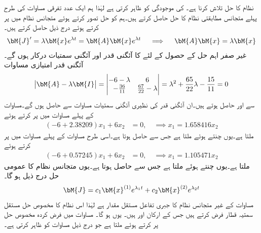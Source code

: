  نظام کا حل تلاش کرنا ہے۔ کی موجودگی   کو ظاہر کرتی ہے لہٰذا ہم ایک عدد تفرقی مساوات کی طرح پہلے متجانس مطابقتی نظام  کا حل حاصل کرتے ہیں۔ہم  کو حل تصور کرتے ہوئے متجانس نظام میں پر کرتے ہوئے درج ذیل حاصل کرتے ہیں۔
\begin{align*}
\bM{J}'=\lambda \bM{x}e^{\lambda t}=\bM{A}\bM{x}e^{\lambda t} \quad \implies \quad \bM{A}\bM{x}=\lambda \bM{x}
\end{align*}
غیر صفر اہم حل کے حصول کے لئے  کا آئگنی قدر اور آئگنی سمتیات درکار ہوں گے۔آئگنی قدر امتیازی مساوات
\begin{align*}
\abs{\bM{A}-\lambda \bM{I}}=\begin{vmatrix} -6-\lambda& 6 \\-\frac{36}{11}&\frac{67}{22}-\lambda \end{vmatrix}=\lambda^2+\frac{65}{22}\lambda-\frac{15}{11}=0
\end{align*}
سے  اور  حاصل ہوتے ہیں۔ان آئگنی قدر کی نظیری آئگنی سمتیات مساوات  سے حاصل ہوں گے۔مساوات  کے پہلے مساوات میں   پر کرتے ہوئے 
\begin{align*}
(-6+2.38209)x_1+6x_2&=0,\quad \implies x_1=1.658416x_2
\end{align*}
ملتا ہے۔یوں  چنتے ہوئے  ملتا ہے جس سے  حاصل ہوتا ہے۔اسی طرح مساوات  کے پہلے مساوات میں   پر کرتے ہوئے 
\begin{align*}
(-6+0.57245)x_1+6x_2&=0,\quad \implies x_1=1.105471x_2
\end{align*}
ملتا ہے۔یوں  چنتے ہوئے  ملتا ہے جس سے  حاصل ہوتا ہے۔یوں متجانس نظام کا عمومی حل درج ذیل ہو گا۔
\begin{align}
\bM{J}=c_1\bM{x}^{(1)}e^{\lambda_1 t}+c_2 \bM{x}^{(2)}e^{\lambda_2 t}
\end{align}
مساوات  کے غیر متجانس نظام کا جبری تفاعل  مستقل مقدار ہے لہٰذا اس نظام کا مخصوص حل  مستقل سمتیہ قطار  فرض کرتے ہیں جس کے ارکان  اور  ہیں۔ یوں  ہو گا۔ مساوات  میں فرض کردہ مخصوص حل پر کرتے ہوئے   ملتا ہے جو درج ذیل  مساوات کو ظاہر کرتی ہے۔
